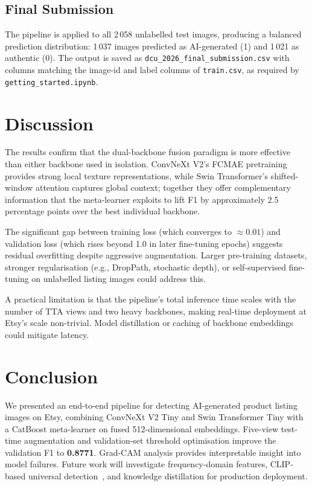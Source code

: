 \documentclass[conference]{IEEEtran}
\begin{document}
\subsection{Final Submission}

The pipeline is applied to all 2\,058 unlabelled test images, producing a
balanced prediction distribution: 1\,037 images predicted as AI-generated (1)
and 1\,021 as authentic (0).  The output is saved as
\texttt{dcu\_2026\_final\_submission.csv} with columns matching the image-id
and label columns of \texttt{train.csv}, as required by
\texttt{getting\_started.ipynb}.

\section{Discussion}
\label{sec:discussion}

The results confirm that the dual-backbone fusion paradigm is more effective
than either backbone used in isolation.  ConvNeXt V2's FCMAE pretraining
provides strong local texture representations, while Swin Transformer's
shifted-window attention captures global context; together they offer
complementary information that the meta-learner exploits to lift F1 by
approximately 2.5 percentage points over the best individual backbone.

The significant gap between training loss (which converges to ${\approx}0.01$)
and validation loss (which rises beyond 1.0 in later fine-tuning epochs) suggests
residual overfitting despite aggressive augmentation.  Larger pre-training
datasets, stronger regularisation (e.g., DropPath, stochastic depth), or
self-supervised fine-tuning on unlabelled listing images could address this.

A practical limitation is that the pipeline's total inference time scales with
the number of TTA views and two heavy backbones, making real-time deployment
at Etsy's scale non-trivial.  Model distillation or caching of backbone
embeddings could mitigate latency.

\section{Conclusion}
\label{sec:conclusion}

We presented an end-to-end pipeline for detecting AI-generated product listing
images on Etsy, combining ConvNeXt V2 Tiny and Swin Transformer Tiny with
a CatBoost meta-learner on fused 512-dimensional embeddings.  Five-view
test-time augmentation and validation-set threshold optimisation improve the
validation F1 to \textbf{0.8771}.  Grad-CAM analysis provides interpretable
insight into model failures.  Future work will investigate frequency-domain
features, CLIP-based universal detection~\cite{ojha2023towards}, and knowledge
distillation for production deployment.
\end{document}
